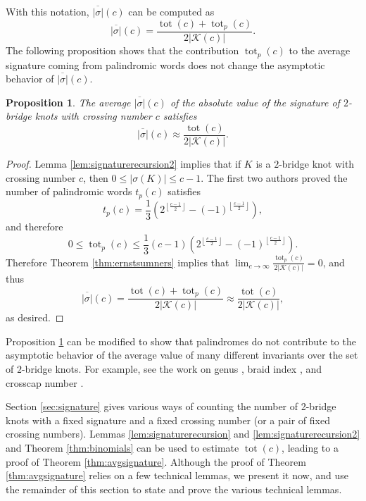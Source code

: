 \documentclass[12pt]{amsart}
\newtheorem{proposition}[theorem]{Proposition}
\theoremstyle{definition}
\theoremstyle{remark}
\numberwithin{equation}{section}
\def\tot{\operatorname{tot}}
\begin{document}
With this notation, $\overline{|\sigma|}(c)$ can be computed as
\[\overline{|\sigma|}(c) = \frac{\tot(c) + \tot_p(c)}{2|\mathcal{K}(c)|}.\]
The following proposition shows that the contribution $\tot_p(c)$ to the average signature coming from palindromic words does not change the asymptotic behavior of $\overline{|\sigma|}(c)$.
\begin{proposition}
\label{prop:ignorepalindromes}
    The average $\overline{|\sigma|}(c)$ of the absolute value of the signature of $2$-bridge knots with crossing number $c$ satisfies
    \[\overline{|\sigma|}(c)\approx \frac{\tot(c)}{2|\mathcal{K}(c)|}.\]
\end{proposition}
\begin{proof}
    Lemma \ref{lem:signaturerecursion2}  implies that if $K$ is a $2$-bridge knot with crossing number $c$, then $0\leq |\sigma(K)|\leq c-1$. The first two authors \cite{CohLow} proved the number of palindromic words $t_p(c)$ satisfies
    \[t_p(c)=\frac{1}{3}\left(2^{\left\lfloor\frac{c-1}{2}\right\rfloor}-(-1)^{\left\lfloor\frac{c-1}{2}\right\rfloor}\right),\]
    and therefore
    \[0\leq \tot_p(c)\leq \frac{1}{3}(c-1)\left(2^{\left\lfloor\frac{c-1}{2}\right\rfloor}-(-1)^{\left\lfloor\frac{c-1}{2}\right\rfloor}\right).\]
    Therefore Theorem \ref{thm:ernstsumners} implies that $\displaystyle\lim_{c\to\infty}\frac{\tot_p(c)}{2|\mathcal{K}(c)|}=0$, and thus
    \[\overline{|\sigma|}(c) = \frac{\tot(c)+\tot_p(c)}{2|\mathcal{K}(c)|}\approx \frac{\tot(c)}{2|\mathcal{K}(c)|},\]
    as desired.
\end{proof}
Proposition \ref{prop:ignorepalindromes} can be modified to show that palindromes do not contribute to the asymptotic behavior of the average value of many different invariants over the set of $2$-bridge knots. For example, see the work on genus \cite{CohLow, CohLowURSI}, braid index \cite{LowURSI:braids, SuzTra:braids}, and  crosscap number \cite{CohKinLowShaVan}.

Section \ref{sec:signature} gives various ways of counting the number of 2-bridge knots with a fixed signature and a fixed crossing number (or a pair of fixed crossing numbers). Lemmas \ref{lem:signaturerecursion} and \ref{lem:signaturerecursion2} and Theorem \ref{thm:binomials} can be used to estimate $\tot(c)$, leading to a proof of Theorem \ref{thm:avgsignature}. Although the proof of Theorem \ref{thm:avgsignature} relies on a few technical lemmas, we present it now, and use the remainder of this section to state and prove the various technical lemmas.
\end{document}
